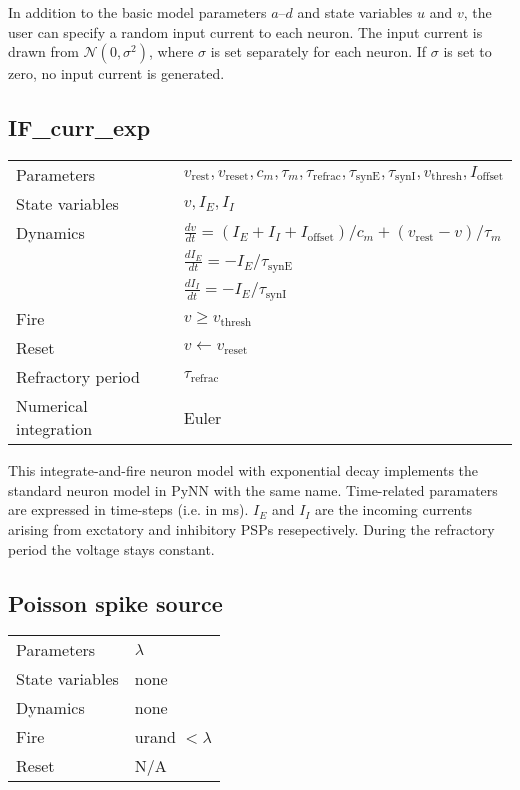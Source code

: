 \documentclass[a4paper]{article}
\newcommand{\param}[2]{#1_{\text{#2}}}
\newcommand{\vparam}[1]{\param{v}{#1}}
\newcommand{\tauparam}[1]{\param{\tau}{#1}}
\newcommand{\iparam}[1]{\param{I}{#1}}
\begin{document}
In addition to the basic model parameters $a$--$d$ and state variables $u$ and
$v$, the user can specify a random input current to each neuron. The input
current is drawn from $\mathcal{N}(0, \sigma^2)$, where $\sigma$ is set
separately for each neuron.  If $\sigma$ is set to zero, no input current is
generated.

\subsection{IF\_curr\_exp}
\label{model:neuron:IF_curr_exp}

\begin{tabular}{ll}
Parameters      & $\vparam{rest}, \vparam{reset}, c_m, \tau_m, \tauparam{refrac}, \tauparam{synE}, \tauparam{synI}, \vparam{thresh}, \iparam{offset}$ \\
State variables & $v, I_E, I_I$                                  \\
Dynamics        & $\frac{dv}{dt} = (I_E + I_I + \iparam{offset}) / c_m + (\vparam{rest}-v)/\tau_m$ \\
				& $\frac{dI_E}{dt} = -I_E/\tauparam{synE}$ \\
				& $\frac{dI_I}{dt} = -I_E/\tauparam{synI}$ \\
Fire            & $v \ge \vparam{thresh}$                           \\
Reset           & $v\leftarrow \vparam{reset}$                      \\
Refractory period & $\tauparam{refrac}$ \\
Numerical integration & Euler \\
\end{tabular}

This integrate-and-fire neuron model with exponential decay implements the
standard neuron model in PyNN with the same name.  Time-related paramaters are
expressed in time-steps (i.e. in \si{\milli \second}). $I_E$ and $I_I$ are the
incoming currents arising from exctatory and inhibitory PSPs resepectively.
During the refractory period the voltage stays constant.

\subsection{Poisson spike source}
\label{model:neuron:poisson}

\begin{tabular}{ll}
Parameters	    & $\lambda$         \\
State variables & none              \\
Dynamics        & none              \\
Fire            & urand $< \lambda$ \\
Reset           & N/A               \\
\end{tabular}
\end{document}
